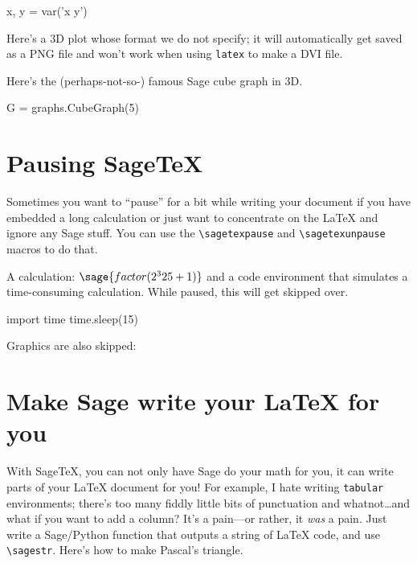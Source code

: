 \documentclass{article}
\begin{document}

\begin{sagesilent}
  x, y = var('x y')
\end{sagesilent}

Here's a 3D plot whose format we do not specify; it will automatically
get saved as a PNG file and won't work when using \texttt{latex} to make
a DVI file.


Here's the (perhaps-not-so-) famous Sage cube graph in 3D.

\begin{sageblock}
  G = graphs.CubeGraph(5)
\end{sageblock}


\section{Pausing Sage\TeX}
\label{sec:pausing-sagetex}

Sometimes you want to ``pause'' for a bit while writing your document if
you have embedded a long calculation or just want to concentrate on the
\LaTeX{} and ignore any Sage stuff. You can use the \verb|\sagetexpause|
and \verb|\sagetexunpause| macros to do that.

\sagetexpause

A calculation: $\sage{factor(2^325 + 1)}$ and a code environment that
simulates a time-consuming calculation. While paused, this will get
skipped over.
\begin{sageblock}
  import time
  time.sleep(15)
\end{sageblock}

Graphics are also skipped: 

\sagetexunpause

\section{Make Sage write your \LaTeX{} for you}

With \textsf{Sage\TeX}, you can not only have Sage do your math for you,
it can write parts of your \LaTeX{} document for you! For example, I
hate writing \texttt{tabular} environments; there's too many fiddly
little bits of punctuation and whatnot\ldots and what if you want to add
a column? It's a pain---or rather, it \emph{was} a pain. Just write a
Sage/Python function that outputs a string of \LaTeX{} code, and use
\verb|\sagestr|. Here's how to make Pascal's triangle.
\end{document}
